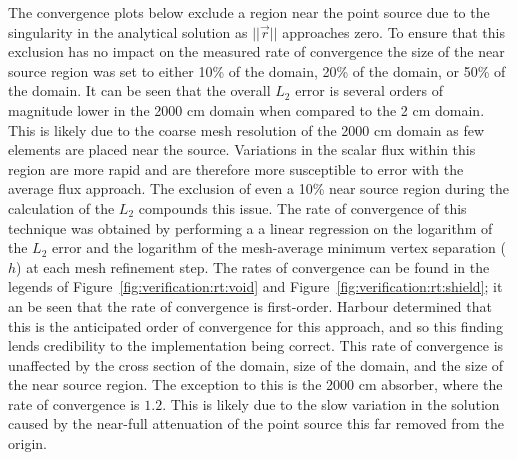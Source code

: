 The convergence plots below exclude a region near the point source due to the singularity in the analytical solution as $||\vec{r}||$ approaches zero. To ensure that this exclusion has no impact on the measured rate of convergence the size of the near source region was set to either 10\% of the domain, 20\% of the domain, or 50\% of the domain. It can be seen that the overall $L_{2}$ error is several orders of magnitude lower in the 2000 cm domain when compared to the 2 cm domain. This is likely due to the coarse mesh resolution of the 2000 cm domain as few elements are placed near the source. Variations in the scalar flux within this region are more rapid and are therefore more susceptible to error with the average flux approach. The exclusion of even a 10\% near source region during the calculation of the $L_{2}$ compounds this issue. The rate of convergence of this technique was obtained by performing a a linear regression on the logarithm of the $L_{2}$ error and the logarithm of the mesh-average minimum vertex separation ($h$) at each mesh refinement step. The rates of convergence can be found in the legends of Figure~\ref{fig:verification:rt:void} and Figure~\ref{fig:verification:rt:shield}; it an be seen that the rate of convergence is first-order. Harbour \cite{harbour_uncollided} determined that this is the anticipated order of convergence for this approach, and so this finding lends credibility to the implementation being correct. This rate of convergence is unaffected by the cross section of the domain, size of the domain, and the size of the near source region. The exception to this is the 2000 cm absorber, where the rate of convergence is $1.2$. This is likely due to the slow variation in the solution caused by the near-full attenuation of the point source this far removed from the origin.

